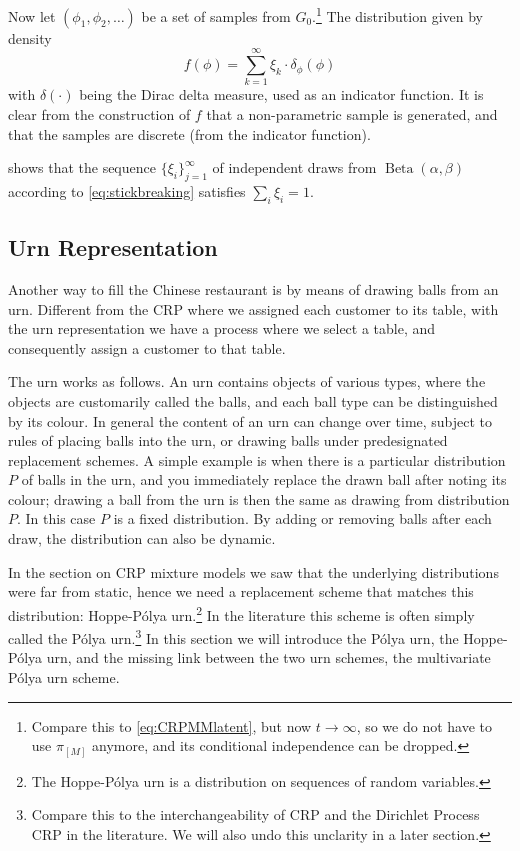 Now let $(\phi_1, \phi_2, \ldots)$ be a set of samples from $G_0$.\footnote{Compare this to \cref{eq:CRPMMlatent}, but now $t\rightarrow\infty$, so we do not have to use $\pi_{[M]}$ anymore, and its conditional independence can be dropped.} The distribution given by density 
\begin{equation}
	f(\phi) = \sum_{k=1}^\infty \xi_k \cdot \delta_{\phi}(\phi) 
\end{equation}
with $\delta(\cdot)$ being the Dirac delta measure, used as an indicator function. It is clear from the construction of $f$ that a non-parametric sample is generated, and that the samples are discrete (from the indicator function).

\textcite{Sethuraman1994A} shows that the sequence $\{\xi_i\}_{j=1}^\infty$  of independent draws from $\operatorname{Beta}(\alpha,\beta)$ according to \cref{eq:stickbreaking} satisfies $\sum_{i} \xi_i = 1$.



\subsection{Urn Representation}
Another way to fill the Chinese restaurant is by means of drawing balls from an urn. Different from the CRP where we assigned each customer to its table, with the urn representation we have a process where we select a table, and consequently assign a customer to that table.

The urn works as follows. An urn contains objects of various types, where the objects are customarily called the balls, and each ball type can be distinguished by its colour. In general the content of an urn can change over time, subject to rules of placing balls into the urn, or drawing balls under predesignated replacement schemes. A simple example is when there is a particular distribution $P$ of balls in the urn, and you immediately replace the drawn ball after noting its colour; drawing a ball from the urn is then the same as drawing from distribution $P$. In this case $P$ is a fixed distribution. By adding or removing balls after each draw, the distribution can also be dynamic.

In the section on CRP mixture models we saw that the underlying distributions were far from static, hence we need a replacement scheme that matches this distribution: Hoppe-P\'olya urn.\footnote{The Hoppe-P\'olya urn is a distribution on sequences of random variables.} In the literature this scheme is often simply called the P\'olya urn.\footnote{Compare this to the interchangeability of CRP and the Dirichlet Process CRP in the literature. We will also undo this unclarity in a later section.} In this section we will introduce the P\'olya urn, the Hoppe-P\'olya urn, and the missing link between the two urn schemes, the multivariate P\'olya urn scheme.

